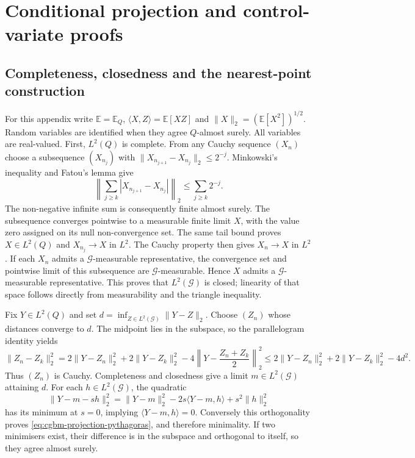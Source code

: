 \documentclass[11pt]{article}
\begin{document}
\section{Conditional projection and control-variate proofs}
\label{app:cgbm-projection}

\subsection{Completeness, closedness and the nearest-point construction}

For this appendix write $\mathbb E=\mathbb E_Q$,
$\langle X,Z\rangle=\mathbb E[XZ]$ and
$\|X\|_2=(\mathbb E[X^2])^{1/2}$. Random variables are identified when
they agree $Q$-almost surely. All variables are real-valued.
First, $L^2(Q)$ is complete. From any Cauchy sequence $(X_n)$ choose a
subsequence $(X_{n_j})$ with
$\|X_{n_{j+1}}-X_{n_j}\|_2\leq2^{-j}$. Minkowski's inequality and
Fatou's lemma give
\begin{equation}
 \left\|\sum_{j\geq k}|X_{n_{j+1}}-X_{n_j}|\right\|_2
 \leq\sum_{j\geq k}2^{-j}.
 \label{eq:cgbm-completeness-tail}
\end{equation}
The non-negative infinite sum is consequently finite almost surely.
The subsequence converges pointwise to a measurable finite limit $X$,
with the value zero assigned on its null non-convergence set. The same
tail bound proves $X\in L^2(Q)$ and $X_{n_j}\to X$ in $L^2$.
The Cauchy property then gives $X_n\to X$ in $L^2$.
If each $X_n$ admits a $\mathcal G$-measurable representative, the
convergence set and pointwise limit of this subsequence are
$\mathcal G$-measurable. Hence $X$ admits a $\mathcal G$-measurable
representative. This proves that $L^2(\mathcal G)$ is closed; linearity
of that space follows directly from measurability and the triangle
inequality.

Fix $Y\in L^2(Q)$ and set
$d=\inf_{Z\in L^2(\mathcal G)}\|Y-Z\|_2$. Choose $(Z_n)$ whose
distances converge to $d$. The midpoint lies in the subspace, so the
parallelogram identity yields
\begin{equation}
 \|Z_n-Z_k\|_2^2
 =2\|Y-Z_n\|_2^2+2\|Y-Z_k\|_2^2
 -4\left\|Y-\frac{Z_n+Z_k}{2}\right\|_2^2
 \leq2\|Y-Z_n\|_2^2+2\|Y-Z_k\|_2^2-4d^2.
 \label{eq:cgbm-projection-existence}
\end{equation}
Thus $(Z_n)$ is Cauchy. Completeness and closedness give a limit
$m\in L^2(\mathcal G)$ attaining $d$. For each
$h\in L^2(\mathcal G)$, the quadratic
\begin{equation}
 \|Y-m-sh\|_2^2
 =\|Y-m\|_2^2-2s\langle Y-m,h\rangle+s^2\|h\|_2^2
 \label{eq:cgbm-projection-orthogonality}
\end{equation}
has its minimum at $s=0$, implying
$\langle Y-m,h\rangle=0$. Conversely this orthogonality proves
\eqref{eq:cgbm-projection-pythagoras}, and therefore minimality.
If two minimisers exist, their difference is in the subspace and
orthogonal to itself, so they agree almost surely.
\end{document}
